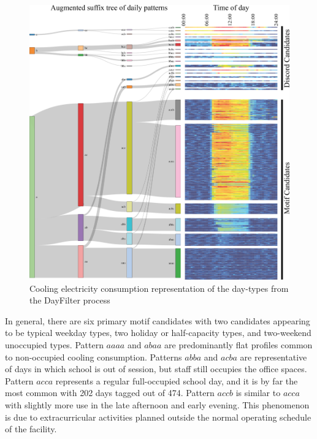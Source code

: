 \begin{figure}[ht!]
\begin{center}
\includegraphics[width=1\columnwidth]{figures/UWC_Chiller_SankeyHeatmapV2/UWC_Chiller_SankeyHeatmapV2}
\caption{Cooling electricity consumption representation of the day-types from the DayFilter process \citep{miller_automated_2015}
\label{fig:sankeyheatmap1}%
}
\end{center}
\end{figure}

In general, there are six primary motif candidates with two candidates appearing to be typical weekday types, two holiday or half-capacity types, and two-weekend unoccupied types. Pattern $aaaa$ and $abaa$ are predominantly flat profiles common to non-occupied cooling consumption. Patterns $abba$ and $acba$ are representative of days in which school is out of session, but staff still occupies the office spaces. Pattern $acca$ represents a regular full-occupied school day, and it is by far the most common with 202 days tagged out of 474. Pattern $accb$ is similar to $acca$ with slightly more use in the late afternoon and early evening. This phenomenon is due to extracurricular activities planned outside the normal operating schedule of the facility.

